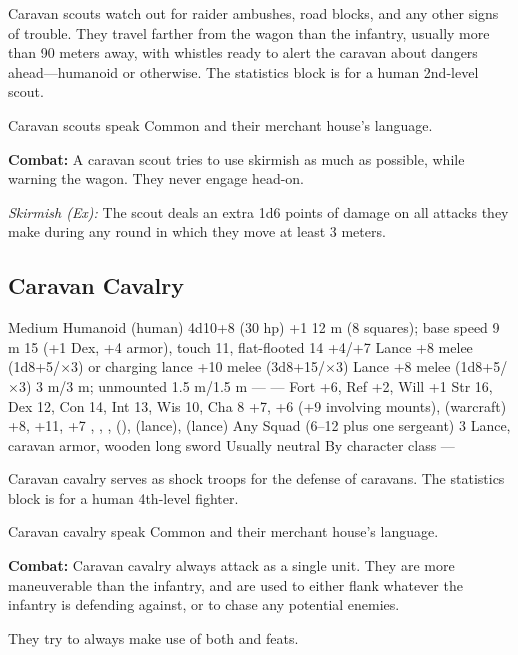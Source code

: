 Caravan scouts watch out for raider ambushes, road blocks, and any other signs of trouble. They travel farther from the wagon than the infantry, usually more than 90 meters away, with whistles ready to alert the caravan about dangers ahead---humanoid or otherwise. The statistics block is for a human 2nd-level scout.

Caravan scouts speak Common and their merchant house's language.

\textbf{Combat:} A caravan scout tries to use skirmish as much as possible, while warning the wagon. They never engage head-on.

\textit{Skirmish (Ex):} The scout deals an extra 1d6 points of damage on all attacks they make during any round in which they move at least 3 meters.


\subsection{Caravan Cavalry}
\begin{MonsterStats}
{Medium Humanoid (human)}
{4d10+8 (30 hp)}
{+1}
{12 m (8 squares); base speed 9 m}
{15 (+1 Dex, +4 armor), touch 11, flat-flooted 14}
{+4/+7}
{Lance +8 melee (1d8+5/$\times$3) or charging lance +10 melee (3d8+15/$\times$3)}
{Lance +8 melee (1d8+5/$\times$3)}
{3 m/3 m; unmounted 1.5 m/1.5 m}
{---}
{---}
{Fort +6, Ref +2, Will +1}
{Str 16, Dex 12, Con 14, Int 13, Wis 10, Cha 8}
{
	 +7,
	 +6 (+9 involving mounts),
	 (warcraft) +8,
	 +11,
	 +7
}
{
	,
	,
	,
	 (),
	 (lance),
	 (lance)
}
{Any}
{Squad (6--12 plus one sergeant)}
{3}
{
	Lance,
	caravan armor,
	wooden long sword
}
{Usually neutral}
{By character class}
{---}
\end{MonsterStats}

Caravan cavalry serves as shock troops for the defense of caravans. The statistics block is for a human 4th-level fighter.

Caravan cavalry speak Common and their merchant house's language.

\textbf{Combat:} Caravan cavalry always attack as a single unit. They are more maneuverable than the infantry, and are used to either flank whatever the infantry is defending against, or to chase any potential enemies.

They try to always make use of both  and  feats.

